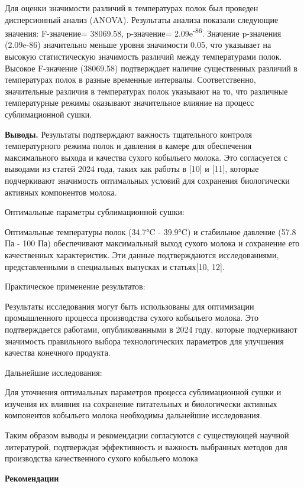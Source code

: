 Для оценки значимости различий в температурах полок был проведен
дисперсионный анализ (ANOVA). Результаты анализа показали следующие
значения: F-значение= 38069.58, p-значение= 2.09e\textsuperscript{-86}.
Значение p-значения (2.09e-86) значительно меньше уровня значимости
0.05, что указывает на высокую статистическую значимость различий между
температурами полок. Высокое F-значение (38069.58) подтверждает наличие
существенных различий в температурах полок в разные временные интервалы.
Соответственно, значительные различия в температурах полок указывают на
то, что различные температурные режимы оказывают значительное влияние на
процесс сублимационной сушки.

{\bfseries Выводы.} Результаты подтверждают важность тщательного контроля
температурного режима полок и давления в камере для обеспечения
максимального выхода и качества сухого кобыльего молока. Это согласуется
с выводами из статей 2024 года, таких как работы в {[}10{]} и {[}11{]},
которые подчеркивают значимость оптимальных условий для сохранения
биологически активных компонентов молока.

Оптимальные параметры сублимационной сушки:

Оптимальные температуры полок (34.7°C - 39.9°C) и стабильное давление
(57.8 Па - 100 Па) обеспечивают максимальный выход сухого молока и
сохранение его качественных характеристик. Эти данные подтверждаются
исследованиями, представленными в специальных выпусках и статьях{[}10,
12{]}.

Практическое применение результатов:

Результаты исследования могут быть использованы для оптимизации
промышленного процесса производства сухого кобыльего молока. Это
подтверждается работами, опубликованными в 2024 году, которые
подчеркивают значимость правильного выбора технологических параметров
для улучшения качества конечного продукта.

Дальнейшие исследования:

Для уточнения оптимальных параметров процесса сублимационной сушки и
изучения их влияния на сохранение питательных и биологически активных
компонентов кобыльего молока необходимы дальнейшие исследования.

Таким образом выводы и рекомендации согласуются с существующей научной
литературой, подтверждая эффективность и важность выбранных методов для
производства качественного сухого кобыльего молока

{\bfseries Рекомендации}

